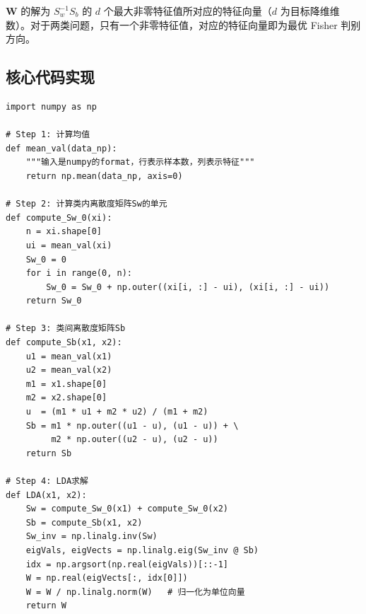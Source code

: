 \documentclass[10.5pt]{config}
\begin{document}
$\mathbf{W}$ 的解为 $S_w^{-1} S_b$ 的 $d$ 个最大非零特征值所对应的特征向量（$d$ 为目标降维维数）。对于两类问题，只有一个非零特征值，对应的特征向量即为最优 Fisher 判别方向。

\subsection{核心代码实现}

\begin{listing}[H]
\begin{verbatim}
import numpy as np

# Step 1: 计算均值
def mean_val(data_np):
    """输入是numpy的format，行表示样本数，列表示特征"""
    return np.mean(data_np, axis=0)

# Step 2: 计算类内离散度矩阵Sw的单元
def compute_Sw_0(xi):
    n = xi.shape[0]
    ui = mean_val(xi)
    Sw_0 = 0
    for i in range(0, n):
        Sw_0 = Sw_0 + np.outer((xi[i, :] - ui), (xi[i, :] - ui))
    return Sw_0

# Step 3: 类间离散度矩阵Sb
def compute_Sb(x1, x2):
    u1 = mean_val(x1)
    u2 = mean_val(x2)
    m1 = x1.shape[0]
    m2 = x2.shape[0]
    u  = (m1 * u1 + m2 * u2) / (m1 + m2)
    Sb = m1 * np.outer((u1 - u), (u1 - u)) + \
         m2 * np.outer((u2 - u), (u2 - u))
    return Sb

# Step 4: LDA求解
def LDA(x1, x2):
    Sw = compute_Sw_0(x1) + compute_Sw_0(x2)
    Sb = compute_Sb(x1, x2)
    Sw_inv = np.linalg.inv(Sw)
    eigVals, eigVects = np.linalg.eig(Sw_inv @ Sb)
    idx = np.argsort(np.real(eigVals))[::-1]
    W = np.real(eigVects[:, idx[0]])
    W = W / np.linalg.norm(W)   # 归一化为单位向量
    return W
\end{verbatim}
\caption{LDA 核心函数实现（均值、类内散布、类间散布、求解）}
\end{listing}
\end{document}
